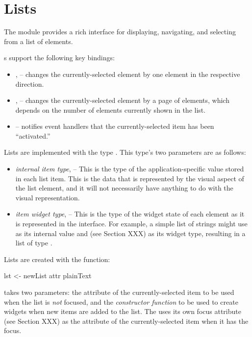 \section{Lists}

The  module provides a rich interface for displaying,
navigating, and selecting from a list of elements.

s support the following key bindings:

\begin{itemize}
\item {},  -- changes the currently-selected element by
  one element in the respective direction.
\item {},  -- changes the currently-selected
  element by a page of elements, which depends on the number of
  elements currently shown in the list.
\item {} -- notifies event handlers that the
  currently-selected item has been ``activated.''
\end{itemize}

Lists are implemented with the type .  This type's two
parameters are as follows:

\begin{itemize}
\item \textit{internal item type},  -- This is the type of the
  application-specific value stored in each list item.  This is the
  data that is represented by the visual aspect of the list element,
  and it will not necessarily have anything to do with the visual
  representation.
\item \textit{item widget type},  -- This is the type of the
  widget state of each element as it is represented in the interface.
  For example, a simple list of strings might use  as its
  internal value and  (see Section XXX) as
  its widget type, resulting in a list of type .
\end{itemize}

Lists are created with the  function:

\begin{haskellcode}
 lst <- newList attr plainText
\end{haskellcode}

 takes two parameters: the attribute of the
currently-selected item to be used when the list is \textit{not}
focused, and the \textit{constructor function} to be used to create
widgets when new items are added to the list.  The  uses its
own focus attribute (see Section XXX) as the attribute of the
currently-selected item when it has the focus.

